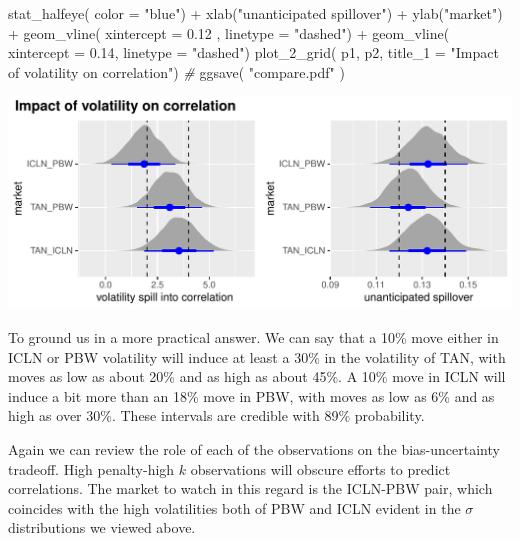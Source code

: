 \documentclass{article}
\newenvironment{Shaded}{\begin{snugshade}}{\end{snugshade}}
\newcommand{\AttributeTok}[1]{\textcolor[rgb]{0.77,0.63,0.00}{#1}}
\newcommand{\CommentTok}[1]{\textcolor[rgb]{0.56,0.35,0.01}{\textit{#1}}}
\newcommand{\FloatTok}[1]{\textcolor[rgb]{0.00,0.00,0.81}{#1}}
\newcommand{\FunctionTok}[1]{\textcolor[rgb]{0.00,0.00,0.00}{#1}}
\newcommand{\NormalTok}[1]{#1}
\newcommand{\SpecialCharTok}[1]{\textcolor[rgb]{0.00,0.00,0.00}{#1}}
\newcommand{\StringTok}[1]{\textcolor[rgb]{0.31,0.60,0.02}{#1}}
\begin{document}
\begin{Shaded}
\begin{Highlighting}[]
  \FunctionTok{stat\_halfeye}\NormalTok{( }\AttributeTok{color =} \StringTok{"blue"}\NormalTok{) }\SpecialCharTok{+}
  \FunctionTok{xlab}\NormalTok{(}\StringTok{"unanticipated spillover"}\NormalTok{) }\SpecialCharTok{+} \FunctionTok{ylab}\NormalTok{(}\StringTok{"market"}\NormalTok{) }\SpecialCharTok{+}
  \FunctionTok{geom\_vline}\NormalTok{( }\AttributeTok{xintercept =} \FloatTok{0.12}\NormalTok{ , }\AttributeTok{linetype =} \StringTok{"dashed"}\NormalTok{) }\SpecialCharTok{+} \FunctionTok{geom\_vline}\NormalTok{( }\AttributeTok{xintercept =} \FloatTok{0.14}\NormalTok{, }\AttributeTok{linetype =} \StringTok{"dashed"}\NormalTok{)}
\FunctionTok{plot\_2\_grid}\NormalTok{( p1, p2, }\AttributeTok{title\_1 =} \StringTok{"Impact of volatility on correlation"}\NormalTok{)}
\CommentTok{\#}
\FunctionTok{ggsave}\NormalTok{( }\StringTok{"compare.pdf"}\NormalTok{ )}
\end{Highlighting}
\end{Shaded}

\includegraphics{compare.pdf}

To ground us in a more practical answer. We can say that a 10\% move
either in ICLN or PBW volatility will induce at least a 30\% in the
volatility of TAN, with moves as low as about 20\% and as high as about
45\%. A 10\% move in ICLN will induce a bit more than an 18\% move in
PBW, with moves as low as 6\% and as high as over 30\%. These intervals
are credible with 89\% probability.

Again we can review the role of each of the observations on the
bias-uncertainty tradeoff. High penalty-high \(k\) observations will
obscure efforts to predict correlations. The market to watch in this
regard is the ICLN-PBW pair, which coincides with the high volatilities
both of PBW and ICLN evident in the \(\sigma\) distributions we viewed
above.
\end{document}
